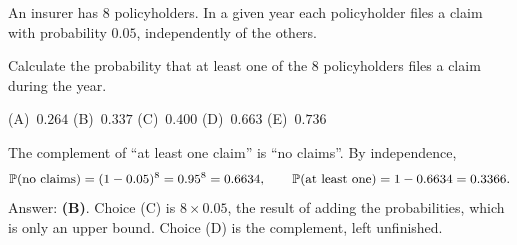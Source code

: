 \begin{example}
An insurer has $8$ policyholders. In a given year each policyholder files a claim with probability $0.05$, independently of the others.

Calculate the probability that at least one of the $8$ policyholders files a claim during the year.

\begin{center}
(A)~$0.264$ \quad (B)~$0.337$ \quad (C)~$0.400$ \quad (D)~$0.663$ \quad (E)~$0.736$
\end{center}
\end{example}
\begin{solution}
The complement of ``at least one claim'' is ``no claims''. By independence,
\[
\mathbb{P}(\text{no claims}) = (1 - 0.05)^8 = 0.95^8 = 0.6634, \qquad
\mathbb{P}(\text{at least one}) = 1 - 0.6634 = 0.3366.
\]
Answer: \textbf{(B)}. Choice (C) is $8 \times 0.05$, the result of adding the probabilities, which is only an upper bound. Choice (D) is the complement, left unfinished.
\end{solution}


